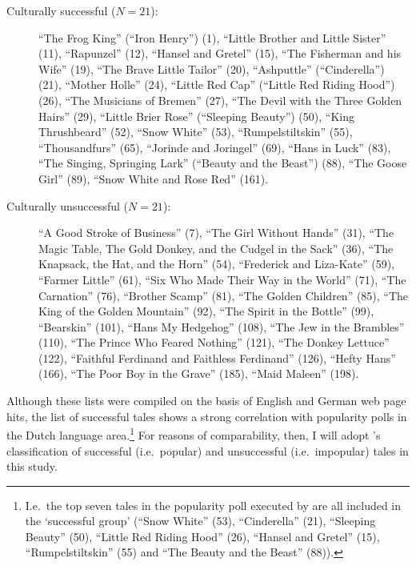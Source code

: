 \begin{description}
\item[Culturally successful ($N = 21$):]
{``The Frog King'' (``Iron Henry'') (1), ``Little Brother and Little Sister'' (11), ``Rapunzel'' (12), ``Hansel and Gretel'' (15), ``The Fisherman and his Wife'' (19), ``The Brave Little Tailor'' (20), ``Ashputtle'' (``Cinderella'') (21), ``Mother Holle'' (24), ``Little Red Cap'' (``Little Red Riding Hood'') (26), ``The Musicians of Bremen'' (27), ``The Devil with the Three Golden Hairs'' (29), ``Little Brier Rose'' (``Sleeping Beauty'') (50), ``King Thrushbeard'' (52), ``Snow White'' (53), ``Rumpelstiltskin'' (55), ``Thousandfurs'' (65), ``Jorinde and Joringel'' (69), ``Hans in Luck'' (83), ``The Singing, Springing Lark'' (``Beauty and the Beast'') (88), ``The Goose Girl'' (89), ``Snow White and Rose Red'' (161).}

\item[Culturally unsuccessful ($N = 21$):]
``A Good Stroke of Business'' (7), ``The Girl Without Hands'' (31), ``The Magic Table, The Gold Donkey, and the Cudgel in the Sack'' (36), ``The Knapsack, the Hat, and the Horn'' (54), ``Frederick and Liza-Kate'' (59), ``Farmer Little'' (61), ``Six Who Made Their Way in the World'' (71), ``The Carnation'' (76), ``Brother Scamp'' (81), ``The Golden Children'' (85), ``The King of the Golden Mountain'' (92), ``The Spirit in the Bottle'' (99), ``Bearskin'' (101), ``Hans My Hedgehog'' (108), ``The Jew in the Brambles'' (110), ``The Prince Who Feared Nothing'' (121), ``The Donkey Lettuce'' (122), ``Faithful Ferdinand and Faithless Ferdinand'' (126), ``Hefty Hans'' (166), ``The Poor Boy in the Grave'' (185), ``Maid Maleen'' (198).
\end{description}

\noindent Although these lists were compiled on the basis of English and German web page hits, the list of successful tales shows a strong correlation with popularity polls in the Dutch language area.\footnote{I.e.\ the top seven tales in the popularity poll executed by \citeauthor{koman:2008} are all included in the `successful group' (``Snow White'' (53), ``Cinderella'' (21), ``Sleeping Beauty'' (50), ``Little Red Riding Hood'' (26), ``Hansel and Gretel'' (15), ``Rumpelstiltskin'' (55) and ``The Beauty and the Beast'' (88)).} For reasons of comparability, then, I will adopt \citeauthor{Norenzayan:2006}'s classification of successful (i.e.\ popular) and unsuccessful (i.e.\ impopular) tales in this study.

